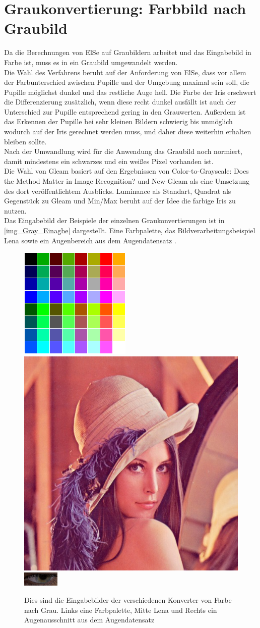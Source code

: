 \section{Graukonvertierung: Farbbild nach Graubild}
\label{Graubild}
Da die Berechnungen von ElSe auf Graubildern arbeitet und das Eingabebild in Farbe ist, muss es in ein Graubild umgewandelt werden.\\
Die Wahl des Verfahrens beruht auf der Anforderung von ElSe, dass vor allem der Farbunterschied zwischen Pupille und der Umgebung maximal sein soll, die Pupille möglichst dunkel und das restliche Auge hell. Die Farbe der Iris erschwert die Differenzierung zusätzlich, wenn diese recht dunkel ausfällt ist auch der Unterschied zur Pupille entsprechend gering in den Grauwerten. Außerdem ist das Erkennen der Pupille bei sehr kleinen Bildern schwierig bis unmöglich wodurch auf der Iris gerechnet werden muss, und daher diese weiterhin erhalten bleiben sollte.\\
Nach der Umwandlung wird für die Anwendung das Graubild noch normiert, damit mindestens ein schwarzes und ein weißes Pixel vorhanden ist.\\
Die Wahl von Gleam basiert auf den Ergebnissen von \glqq Color-to-Grayscale: Does the Method Matter in Image Recognition?\grqq \cite{rgb_to_Gray} und New-Gleam als eine Umsetzung des dort veröffentlichtem Ausblicks. Luminance als Standart, Quadrat als Gegenstück zu Gleam und Min/Max beruht auf der Idee die farbige Iris zu nutzen.\\
Das Eingabebild der Beispiele der einzelnen Graukonvertierungen ist in \autoref{img_Gray_Einagbe} dargestellt. Eine Farbpalette, das Bildverarbeitungsbeispiel Lena sowie ein Augenbereich aus dem Augendatensatz \cite{database_Eye}. 
\begin{figure}
	\centering
	\includegraphics[width=0.19\linewidth]{img/Farbtafel2}
	\includegraphics[width=0.19\linewidth]{img/lena}
	\includegraphics[width=0.19\linewidth]{img/Auge}
	\caption{Dies sind die Eingabebilder der verschiedenen Konverter von Farbe nach Grau. Links eine Farbpalette, Mitte Lena und Rechts ein Augenausschnitt aus dem Augendatensatz \cite{database_Eye}}
	\label{img_Gray_Einagbe}
\end{figure}

